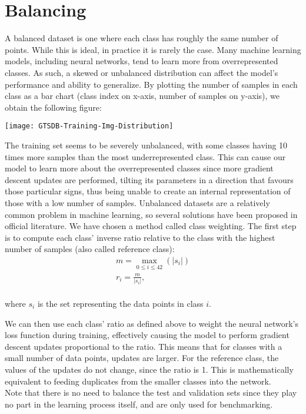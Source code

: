 \section{Balancing}
A balanced dataset is one where each class has roughly the same number of points. While this is ideal, in practice it is rarely the case. Many machine learning models, including neural networks, tend to learn more from overrepresented classes. As such, a skewed or unbalanced distribution can affect the model's performance and ability to generalize. By plotting the number of samples in each class as a bar chart (class index on x-axis, number of samples on y-axis), we obtain the following figure:\\
\begin{center}
\texttt{[image: GTSDB-Training-Img-Distribution]}
\end{center}
The training set seems to be severely unbalanced, with some classes having 10 times more samples than the most underrepresented class. This can cause our model to learn more about the overrepresented classes since more gradient descent updates are performed, tilting its parameters in a direction that favours those particular signs, thus being unable to create an internal representation of those with a low number of samples. 
Unbalanced datasets are a relatively common problem in machine learning, so several solutions have been proposed in official literature. We have chosen a method called class weighting. The first step is to compute each class' inverse ratio relative to the class with the highest number of samples (also called reference class):\\
\begin{gather*}
	m = \max\limits_{0 \leq i \leq 42} (|s_i|)\\
	r_i =  \frac{m}{|s_i|},\\
\end{gather*}
\begin{center}
	where $s_i$ is the set representing the data points in class $i$.
\end{center}	
We can then use each class' ratio as defined above to weight the neural network's loss function during training, effectively causing the model to perform gradient descent updates proportional to the ratio. This means that for classes with a small number of data points, updates are larger. For the reference class, the values of the updates do not change, since the ratio is 1. This is mathematically equivalent to feeding duplicates from the smaller classes into the network.\\
Note that there is no need to balance the test and validation sets since they play no part in the learning process itself, and are only used for benchmarking.
